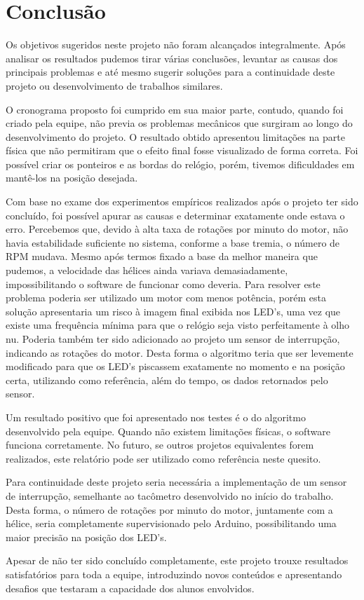 \chapter{Conclusão}
\label{chap:concl}

Os objetivos sugeridos neste projeto não foram alcançados integralmente. Após analisar os resultados pudemos tirar várias conclusões, levantar as causas dos principais problemas e até mesmo sugerir soluções para a continuidade deste projeto ou desenvolvimento de trabalhos similares.

O cronograma proposto foi cumprido em sua maior parte, contudo, quando foi criado pela equipe, não previa os problemas mecânicos que surgiram ao longo do desenvolvimento do projeto. O resultado obtido apresentou limitações na parte física que não permitiram que o efeito final fosse visualizado de forma correta. Foi possível criar os ponteiros e as bordas do relógio, porém, tivemos dificuldades em mantê-los na posição desejada.

Com base no exame dos experimentos empíricos realizados após o projeto ter sido concluído, foi possível apurar as causas e determinar exatamente onde estava o erro. Percebemos que, devido à alta taxa de rotações por minuto do motor, não havia estabilidade suficiente no sistema, conforme a base tremia, o número de RPM mudava. Mesmo após termos fixado a base da melhor maneira que pudemos, a velocidade das hélices ainda variava demasiadamente, impossibilitando o software de funcionar como deveria. Para resolver este problema poderia ser utilizado um motor com menos potência, porém esta solução apresentaria um risco à imagem final exibida nos LED's, uma vez que existe uma frequência mínima para que o relógio seja visto perfeitamente à olho nu. Poderia também ter sido adicionado ao projeto um sensor de interrupção, indicando as rotações do motor. Desta forma o algoritmo teria que ser levemente modificado para que os LED's piscassem exatamente no momento e na posição certa, utilizando como referência, além do tempo, os dados retornados pelo sensor.

Um resultado positivo que foi apresentado nos testes é o do algoritmo desenvolvido pela equipe. Quando não existem limitações físicas, o software funciona corretamente. No futuro, se outros projetos equivalentes forem realizados, este relatório pode ser utilizado como referência neste quesito.

Para continuidade deste projeto seria necessária a implementação de um sensor de interrupção, semelhante ao tacômetro desenvolvido no início do trabalho. Desta forma, o número de rotações por minuto do motor, juntamente com a hélice, seria completamente supervisionado pelo Arduino, possibilitando uma maior precisão na posição dos LED's.

Apesar de não ter sido concluído completamente, este projeto trouxe resultados satisfatórios para toda a equipe, introduzindo novos conteúdos e apresentando desafios que testaram a capacidade dos alunos envolvidos.
